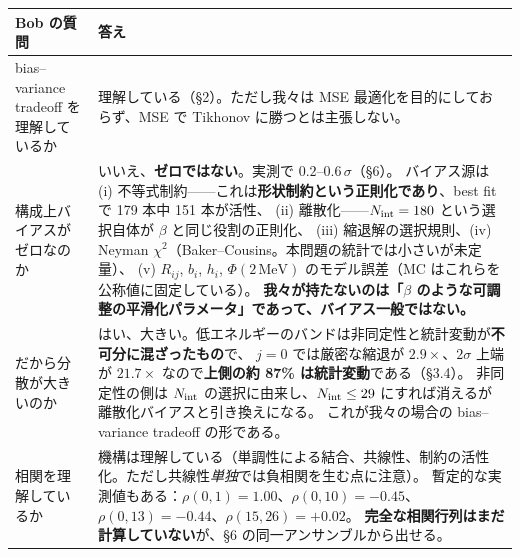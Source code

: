 \documentclass[11pt,a4paper]{ltjsarticle}
\newcommand{\Nint}{N_{\rm int}}
\begin{document}
\begin{center}
\begin{tabular}{p{}p{}}
\toprule
\textbf{Bob の質問} & \textbf{答え} \\
\midrule
bias--variance tradeoff を理解しているか &
理解している（\S2）。ただし我々は MSE 最適化を目的にしておらず、MSE で Tikhonov に勝つとは主張しない。 \\[3pt]
構成上バイアスがゼロなのか &
いいえ、\textbf{ゼロではない}。実測で $0.2$--$0.6\,\sigma$（\S6）。
バイアス源は (i) 不等式制約——これは\textbf{形状制約という正則化であり}、best fit で 179 本中 151 本が活性、
(ii) 離散化——$\Nint=180$ という選択自体が $\beta$ と同じ役割の正則化、
(iii) 縮退解の選択規則、(iv) Neyman $\chi^2$（Baker--Cousins。本問題の統計では小さいが未定量）、
(v) $R_{ij}$, $b_i$, $h_i$, $\Phi(2\,\mathrm{MeV})$ のモデル誤差（MC はこれらを公称値に固定している）。
\textbf{我々が持たないのは「$\beta$ のような可調整の平滑化パラメータ」であって、バイアス一般ではない。} \\[3pt]
だから分散が大きいのか &
はい、大きい。低エネルギーのバンドは非同定性と統計変動が\textbf{不可分に混ざったもの}で、
$j=0$ では厳密な縮退が $2.9\times$、$2\sigma$ 上端が $21.7\times$ なので\textbf{上側の約 87\% は統計変動}である（\S3.4）。
非同定性の側は $\Nint$ の選択に由来し、$\Nint\le29$ にすれば消えるが離散化バイアスと引き換えになる。
これが我々の場合の bias--variance tradeoff の形である。 \\[3pt]
相関を理解しているか &
機構は理解している（単調性による結合、共線性、制約の活性化。ただし共線性\emph{単独}では負相関を生む点に注意）。
暫定的な実測値もある：$\rho(0,1)=1.00$、$\rho(0,10)=-0.45$、$\rho(0,13)=-0.44$、$\rho(15,26)=+0.02$。
\textbf{完全な相関行列はまだ計算していない}が、\S6 の同一アンサンブルから出せる。 \\
\bottomrule
\end{tabular}
\end{center}
\end{document}
